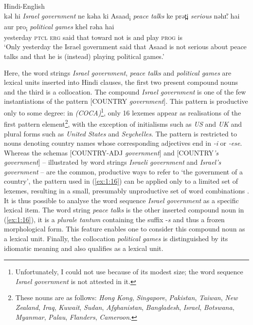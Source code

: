\ea \label{ex:1:16}
Hindi-English \citep[228]{bhatt-1997}\\
\gll kəl hi \textit{Israel} \textit{government} ne kəha ki Asaad\textsubscript{i} \textit{peace talks} ke prət̪i \textit{serious} nəhɪ̃ː hai aur pro\textsubscript{i} \textit{political} \textit{games} khel rəha hai\\
yesterday \textsc{ptcl} {} {} \textsc{erg} said that {} {} {} toward {} not is and {} {} {} play \textsc{prog} is\\
\glt `Only yesterday the Israel government said that Asaad is not serious about peace talks and that he is (instead) playing political games.'
\z

\noindent Here, the word strings \textit{Israel government}, \textit{peace talks} and \textit{political games} are lexical units inserted into Hindi clauses, the first two present compound nouns and the third is a collocation. The compound \textit{Israel government} is one of the few instantiations of the pattern [COUNTRY \textit{government}]. This pattern is productive only to some degree: in  \textit{(COCA)}\footnote{Unfortunately, I could not use  because of its modest size; the word sequence \textit{Israel government} is not attested in it.
}, only 16 lexemes appear as realisations of the first pattern element\footnote{These nouns are as follows: \textit{Hong Kong}, \textit{Singapore}, \textit{Pakistan}, \textit{Taiwan}, \textit{New Zealand}, \textit{Iraq}, \textit{Kuwait}, \textit{Sudan}, \textit{Afghanistan}, \textit{Bangladesh}, \textit{Israel}, \textit{Botswana}, \textit{Myanmar}, \textit{Palau}, \textit{Flanders}, \textit{Cameroon}.
}, with the exception of initialisms such as \textit{US} and \textit{UK} and plural forms such as \textit{United States} and \textit{Seychelles}. The pattern is restricted to nouns denoting country names whose corresponding adjectives end in \textit{-i} or \textit{-ese}. Whereas the schemas [\MakeUppercase{country-adj} \textit{government}] and [\MakeUppercase{country}\textit{'s government}] -- illustrated by word strings \textit{Israeli government} and \textit{Israel's government} -- are the common, productive ways to refer to `the government of a country', the pattern used in (\ref{ex:1:16}) can be applied only to a limited set of lexemes, resulting in a small, presumably unproductive set of word combinations \citep[cf.][74]{bauer01}. It is thus possible to analyse the word sequence \textit{Israel government} as a specific lexical item. The word string \textit{peace talks} is the other inserted compound noun in (\ref{ex:1:16}), it is a \textit{plurale tantum} containing the suffix -\textit{s} and thus a frozen morphological form. This feature enables one to consider this compound noun as a lexical unit. Finally, the collocation \textit{political games} is distinguished by its idiomatic meaning and also qualifies as a lexical unit.

